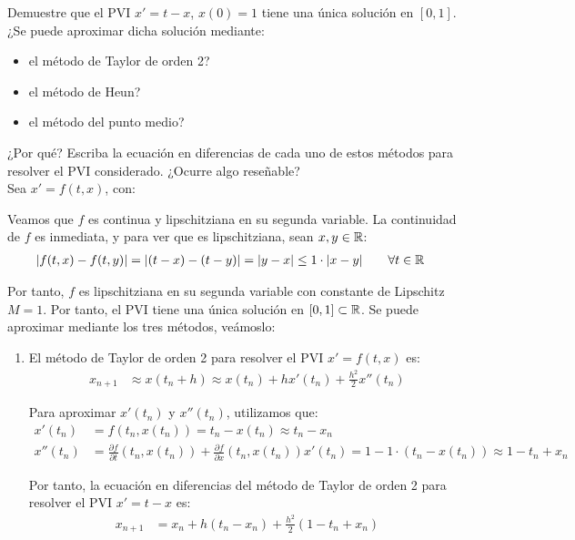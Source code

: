 \begin{ejercicio}\label{ej:3.1.7}
    Demuestre que el PVI $x' = t - x$, $x(0) = 1$ tiene una única solución en $[0, 1]$. ¿Se puede aproximar dicha solución mediante:
    \begin{itemize}
        \item el método de Taylor de orden 2?
        \item el método de Heun?
        \item el método del punto medio?
    \end{itemize}
    ¿Por qué? Escriba la ecuación en diferencias de cada uno de estos métodos para resolver el PVI considerado. ¿Ocurre algo reseñable?\\

    Sea $x'=f(t, x)$, con:

    Veamos que $f$ es continua y lipschitziana en su segunda variable. La continuidad de $f$ es inmediata, y para ver que es lipschitziana, sean $x,y\in \mathbb{R}$:
    \begin{align*}
        |f(t, x) - f(t, y)| &= |(t - x) - (t - y)| = |y - x|\leq 1\cdot |x-y|\qquad \forall t\in \mathbb{R}
    \end{align*}

    Por tanto, $f$ es lipschitziana en su segunda variable con constante de Lipschitz $M = 1$. Por tanto, el PVI tiene una única solución en $[0,1]\subset \mathbb{R}$. Se puede aproximar mediante los tres métodos, veámoslo:
    \begin{enumerate}
        \item El método de Taylor de orden 2 para resolver el PVI $x' = f(t, x)$ es:
        \begin{align*}
            x_{n+1} &\approx x(t_n + h) \approx x(t_n) + hx'(t_n) + \frac{h^2}{2} x''(t_n)
        \end{align*}

        Para aproximar $x'(t_n)$ y $x''(t_n)$, utilizamos que:
        \begin{align*}
            x'(t_n) &= f(t_n, x(t_n)) = t_n - x(t_n)\approx t_n - x_n \\
            x''(t_n) &= \frac{\partial f}{\partial t}(t_n, x(t_n)) + \frac{\partial f}{\partial x}(t_n, x(t_n)) x'(t_n) = 1 - 1\cdot (t_n - x(t_n)) \approx 1 - t_n + x_n
        \end{align*}

        Por tanto, la ecuación en diferencias del método de Taylor de orden 2 para resolver el PVI $x' = t - x$ es:
        \begin{align*}
            x_{n+1} &= x_n + h(t_n - x_n) + \frac{h^2}{2} (1 - t_n + x_n)
        \end{align*}


    \end{enumerate}
\end{ejercicio}

